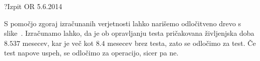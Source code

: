 \begin{naloga}{?}{Izpit OR 5.6.2014}
\begin{odgovor}
\begin{enumerate}[(a)]
S pomočjo zgoraj izračunanih verjetnosti
lahko narišemo odločitveno drevo s slike~\fig.
Izračunamo lahko, da je ob opravljanju testa
pričakovana življenjska doba $8.537$ mesecev,
kar je več kot $8.4$ mesecev brez testa,
zato se odločimo za test.
Če test napove uspeh, se odločimo za operacijo, sicer pa ne.
\end{enumerate}

\begin{slika}
\makebox[\textwidth][c]{
\pgfslika
}
\end{slika}
\end{odgovor}
\end{naloga}
